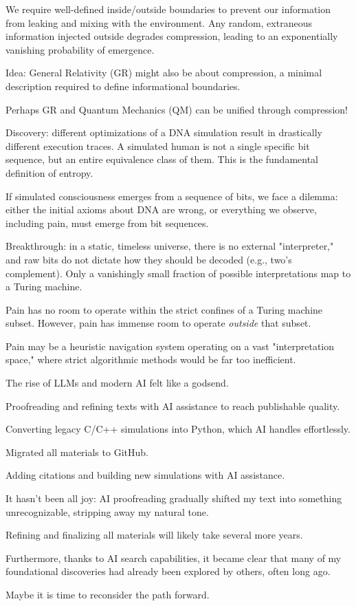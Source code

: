 \begin{description}
  We require well-defined inside/outside boundaries to prevent our information from leaking and mixing with the environment. Any random, extraneous information injected outside degrades compression, leading to an exponentially vanishing probability of emergence.

  Idea: General Relativity (GR) might also be about compression, a minimal description required to define informational boundaries.

  Perhaps GR and Quantum Mechanics (QM) can be unified through compression!

\item[\textbf{2019}: The Consciousness Breakthrough]
  Discovery: different optimizations of a DNA simulation result in drastically different execution traces. A simulated human is not a single specific bit sequence, but an entire equivalence class of them. This is the fundamental definition of entropy.

  If simulated consciousness emerges from a sequence of bits, we face a dilemma: either the initial axioms about DNA are wrong, or everything we observe, including pain, must emerge from bit sequences.

  Breakthrough: in a static, timeless universe, there is no external "interpreter," and raw bits do not dictate how they should be decoded (e.g., two's complement). Only a vanishingly small fraction of possible interpretations map to a Turing machine.

  Pain has no room to operate within the strict confines of a Turing machine subset. However, pain has immense room to operate \textit{outside} that subset.

  Pain may be a heuristic navigation system operating on a vast "interpretation space," where strict algorithmic methods would be far too inefficient.

\item[\textbf{2022--2023}: From DocBook to LaTeX]
  The rise of LLMs and modern AI felt like a godsend.

  Proofreading and refining texts with AI assistance to reach publishable quality.

  Converting legacy C/C++ simulations into Python, which AI handles effortlessly.

\item[\textbf{2024 -- Present}]
  Migrated all materials to GitHub.

  Adding citations and building new simulations with AI assistance.

  It hasn’t been all joy: AI proofreading gradually shifted my text into something unrecognizable, stripping away my natural tone.

  Refining and finalizing all materials will likely take several more years.

  Furthermore, thanks to AI search capabilities, it became clear that many of my foundational discoveries had already been explored by others, often long ago.

  Maybe it is time to reconsider the path forward.

\end{description}


